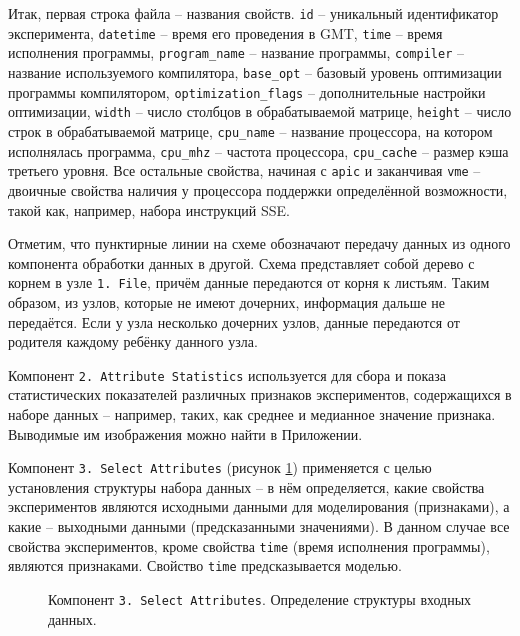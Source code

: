 Итак, первая строка файла -- названия свойств. \texttt{id} -- уникальный идентификатор эксперимента, \texttt{datetime} -- время его проведения в GMT, \texttt{time} -- время исполнения программы, \texttt{program_name} -- название программы, \texttt{compiler} -- название используемого компилятора, \texttt{base_opt} -- базовый уровень оптимизации программы компилятором, \texttt{optimization_flags} -- дополнительные настройки оптимизации, \texttt{width} -- число столбцов в обрабатываемой матрице, \texttt{height} -- число строк в обрабатываемой матрице, \texttt{cpu_name} -- название процессора, на котором исполнялась программа, \texttt{cpu_mhz} -- частота процессора, \texttt{cpu_cache} -- размер кэша третьего уровня. Все остальные свойства, начиная с \texttt{apic} и заканчивая \texttt{vme} -- двоичные свойства наличия у процессора поддержки определённой возможности, такой как, например, набора инструкций SSE.

Отметим, что пунктирные линии на схеме обозначают передачу данных из одного компонента обработки данных в другой. Схема представляет собой дерево с корнем в узле \texttt{1. File}, причём данные передаются от корня к листьям. Таким образом, из узлов, которые не имеют дочерних, информация дальше не передаётся. Если у узла несколько дочерних узлов, данные передаются от родителя каждому ребёнку данного узла.

Компонент \texttt{2. Attribute Statistics} используется для сбора и показа статистических показателей различных признаков экспериментов, содержащихся в наборе данных -- например, таких, как среднее и медианное значение признака. Выводимые им изображения можно найти в Приложении.

Компонент \texttt{3. Select Attributes} (рисунок \ref{img:3-Select-Attributes}) применяется с целью установления структуры набора данных -- в нём определяется, какие свойства экспериментов являются исходными данными для моделирования (признаками), а какие -- выходными данными (предсказанными значениями). В данном случае все свойства экспериментов, кроме свойства \texttt{time} (время исполнения программы), являются признаками. Свойство \texttt{time} предсказывается моделью.

\begin{figure}[H]
    \caption{Компонент \texttt{3. Select Attributes}. Определение структуры входных данных.}
    \label{img:3-Select-Attributes}
\end{figure}

